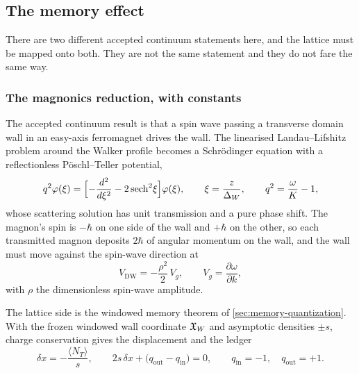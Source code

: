 \subsection{The memory effect}
\label{sec:reduction-memory}

There are two different accepted continuum statements here, and the lattice must
be mapped onto both. They are not the same statement and they do not fare the
same way.

\subsubsection*{The magnonics reduction, with constants}

The accepted continuum result is that a spin wave passing a transverse domain
wall in an easy-axis ferromagnet drives the wall. The linearised
Landau--Lifshitz problem around the Walker profile becomes a Schr\"odinger
equation with a reflectionless P\"oschl--Teller potential,
\begin{equation}
  q^2\varphi(\xi)=\Bigl[-\frac{d^2}{d\xi^2}-2\,\mathrm{sech}^2\xi\Bigr]\varphi(\xi),
  \qquad
  \xi=\frac{z}{\Delta_W},\qquad q^2=\frac{\omega}{K}-1,
  \label{eq:red-pt}
\end{equation}
whose scattering solution has unit transmission and a pure phase shift. The
magnon's spin is $-\hbar$ on one side of the wall and $+\hbar$ on the other, so
each transmitted magnon deposits $2\hbar$ of angular momentum on the wall, and
the wall must move against the spin-wave direction at
\begin{equation}
  V_{\mathrm{DW}}=-\frac{\rho^2}{2}\,V_g,
  \qquad V_g=\frac{\partial\omega}{\partial k},
  \label{eq:red-ywx}
\end{equation}
with $\rho$ the dimensionless spin-wave amplitude.

The lattice side is the windowed memory theorem of
\cref{sec:memory-quantization}. With the frozen windowed wall coordinate
$\mathfrak{X}_W$ and asymptotic densities $\pm s$, charge conservation gives the
displacement and the ledger
\begin{equation}
  \delta x=-\frac{\langle N_T\rangle}{s},
  \qquad
  2s\,\delta x+\bigl(q_{\mathrm{out}}-q_{\mathrm{in}}\bigr)=0,
  \qquad q_{\mathrm{in}}=-1,\quad q_{\mathrm{out}}=+1 .
  \label{eq:red-ledger}
\end{equation}


